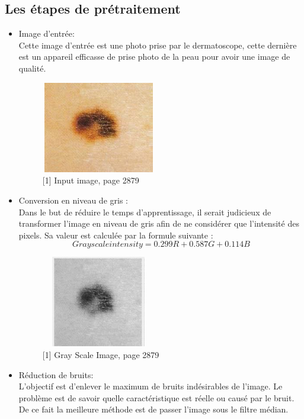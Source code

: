 \documentclass[12pt, letterpaper]{article}
\begin{document}
\subsection{Les étapes de prétraitement}
\begin{itemize}
		\item Image d'entrée:\\
		Cette image d’entrée est une photo prise par le dermatoscope, cette dernière est un appareil efficasse de prise photo de la peau pour avoir une image de qualité. 
		\begin{figure}[H]
    \includegraphics[width=5cm,height=4cm]{images/input_1.png}
    \caption{[1] Input image, page 2879}
    \label{fig:L1}
\end{figure}
		\item Conversion en niveau de gris :\\
Dans le but de réduire le temps d’apprentissage, il serait judicieux de transformer l’image en niveau de gris afin de ne considérer que l’intensité des pixels.
Sa valeur est calculée par la formule suivante :
$$Grayscale intensity = 0.299 R + 0.587 G + 0.114 B$$
		\begin{figure}[H]
    \includegraphics[width=5cm,height=4cm]{images/input_2.png}
    \caption{[1] Gray Scale Image, page 2879}
    \label{fig:L1}
\end{figure}
		\item Réduction de bruits:\\
L’objectif est d’enlever le maximum de bruits indésirables de l’image. Le problème est de savoir quelle caractéristique est réelle ou causé par le bruit. De ce fait la meilleure méthode est de passer l’image sous le filtre médian.
		\begin{figure}[H]

\end{figure}
\end{itemize}
\end{document}
